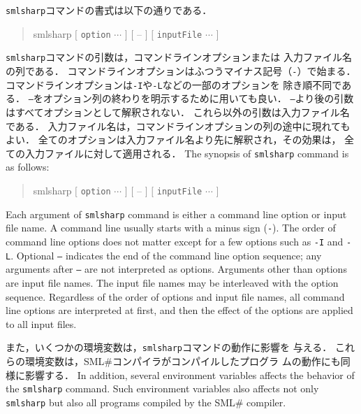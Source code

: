 \documentclass{jbook}
\newcommand{\smlsharp}{SML\#}
\newcommand{\term}[1]{\mbox{{\tt #1}}}
\newenvironment{program}{\begin{quote}\begin{tt}}%
                        {\end{tt}\end{quote}}
\begin{document}
\ifjp%
	{\tt smlsharp}コマンドの書式は以下の通りである．
\begin{program}
smlsharp $[$ \term{option} $\cdots$ $]$ $[$ -- $]$ $[$ \term{inputFile} $\cdots$ $]$
\end{program}
	{\tt smlsharp}コマンドの引数は，コマンドラインオプションまたは
入力ファイル名の列である．
	コマンドラインオプションはふつうマイナス記号（{\tt -}）で始まる．
	コマンドラインオプションは{\tt -I}や{\tt -L}などの一部のオプションを
除き順不同である．
	{\tt --}をオプション列の終わりを明示するために用いても良い．
	{\tt --}より後の引数はすべてオプションとして解釈されない．
	これら以外の引数は入力ファイル名である．
	入力ファイル名は，コマンドラインオプションの列の途中に現れてもよい．
	全てのオプションは入力ファイル名より先に解釈され，その効果は，
全ての入力ファイルに対して適用される．
\else%
	The synopsis of {\tt smlsharp} command is as follows:
\begin{program}
smlsharp $[$ \term{option} $\cdots$ $]$ $[$ -- $]$ $[$ \term{inputFile} $\cdots$ $]$
\end{program}
	Each argument of {\tt smlsharp} command is either a command line
option or input file name.
	A command line usually starts with a minus sign ({\tt -}).
	The order of command line options does not matter except for
a few options such as {\tt -I} and {\tt -L}.
	Optional {\tt --} indicates the end of the command line option
sequence; any arguments after {\tt --} are not interpreted as options.
	Arguments other than options are input file names.
	The input file names may be interleaved with the option sequence.
	Regardless of the order of options and input file names,
all command line options are interpreted at first, and then the effect of
the options are applied to all input files.
\fi%

\ifjp%
	また，いくつかの環境変数は，{\tt smlsharp}コマンドの動作に影響を
与える．
	これらの環境変数は，\smlsharp{}コンパイラがコンパイルしたプログラ
ムの動作にも同様に影響する．
\else%
	In addition, several environment variables affects the behavior
of the {\tt smlsharp} command.
	Such environment variables also affects not only {\tt smlsharp}
but also all programs compiled by the \smlsharp{} compiler.
\fi%
\end{document}
